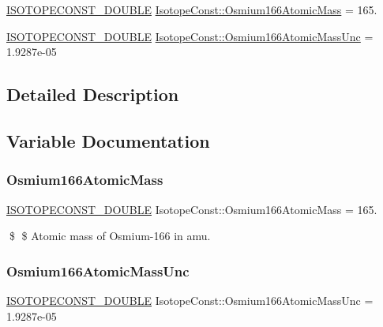 \begin{DoxyCompactItemize}
\item 
\mbox{\hyperlink{group___isotope_const-_macros_ga8f45a7272ce02c0b4c65c44636ed719a}{I\+S\+O\+T\+O\+P\+E\+C\+O\+N\+S\+T\+\_\+\+D\+O\+U\+B\+LE}} \mbox{\hyperlink{group___isotope_const-_osmium-_os166_gab194358a6f04fbe9f9c320ecda7610c6}{Isotope\+Const\+::\+Osmium166\+Atomic\+Mass}} = 165.
\item 
\mbox{\hyperlink{group___isotope_const-_macros_ga8f45a7272ce02c0b4c65c44636ed719a}{I\+S\+O\+T\+O\+P\+E\+C\+O\+N\+S\+T\+\_\+\+D\+O\+U\+B\+LE}} \mbox{\hyperlink{group___isotope_const-_osmium-_os166_ga449f04f6bf689a52225108450b35c33e}{Isotope\+Const\+::\+Osmium166\+Atomic\+Mass\+Unc}} = 1.\+9287e-\/05
\end{DoxyCompactItemize}


\subsection{Detailed Description}


\subsection{Variable Documentation}
\mbox{\label{group___isotope_const-_osmium-_os166_gab194358a6f04fbe9f9c320ecda7610c6}} 
\subsubsection{\texorpdfstring{Osmium166\+Atomic\+Mass}{Osmium166AtomicMass}}
{\footnotesize\ttfamily \mbox{\hyperlink{group___isotope_const-_macros_ga8f45a7272ce02c0b4c65c44636ed719a}{I\+S\+O\+T\+O\+P\+E\+C\+O\+N\+S\+T\+\_\+\+D\+O\+U\+B\+LE}} Isotope\+Const\+::\+Osmium166\+Atomic\+Mass = 165.}

\$ \$ Atomic mass of Osmium-\/166 in amu. \mbox{\label{group___isotope_const-_osmium-_os166_ga449f04f6bf689a52225108450b35c33e}} 
\subsubsection{\texorpdfstring{Osmium166\+Atomic\+Mass\+Unc}{Osmium166AtomicMassUnc}}
{\footnotesize\ttfamily \mbox{\hyperlink{group___isotope_const-_macros_ga8f45a7272ce02c0b4c65c44636ed719a}{I\+S\+O\+T\+O\+P\+E\+C\+O\+N\+S\+T\+\_\+\+D\+O\+U\+B\+LE}} Isotope\+Const\+::\+Osmium166\+Atomic\+Mass\+Unc = 1.\+9287e-\/05}

